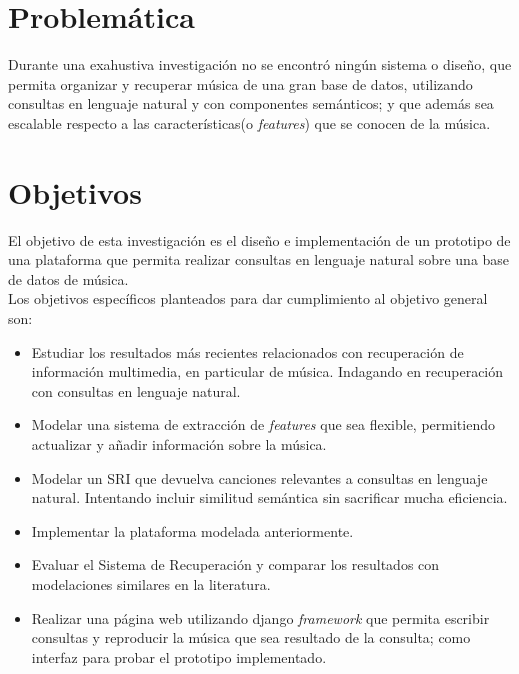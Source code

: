 \section{Problemática}
Durante una exahustiva investigación no se encontró ningún sistema o diseño, que permita organizar y recuperar música de una gran base de datos, utilizando consultas en lenguaje natural y con componentes semánticos; y que además sea escalable respecto a las características(o \textit{features}) que se conocen de la música. \\
\section{Objetivos}
El objetivo de esta investigación es el diseño e implementación de un prototipo de una plataforma que permita realizar consultas en lenguaje natural sobre una base de datos de música.\\
Los objetivos específicos planteados para dar cumplimiento al objetivo general son:
\begin{itemize}
    \item Estudiar los resultados más recientes relacionados con recuperación de información multimedia, en particular de música. Indagando en recuperación con consultas en lenguaje natural.
    \item Modelar una sistema de extracción de \textit{features} que sea flexible, permitiendo actualizar y añadir información sobre la música.
    \item Modelar un SRI que devuelva canciones relevantes a consultas en lenguaje natural. Intentando incluir similitud semántica sin sacrificar mucha eficiencia.
    \item Implementar la plataforma modelada anteriormente.
    \item Evaluar el Sistema de Recuperación y comparar los resultados con modelaciones similares en la literatura.
    \item Realizar una página web utilizando django \textit{framework} que permita escribir consultas y reproducir la música que sea resultado de la consulta; como interfaz para probar el prototipo implementado.
\end{itemize}
